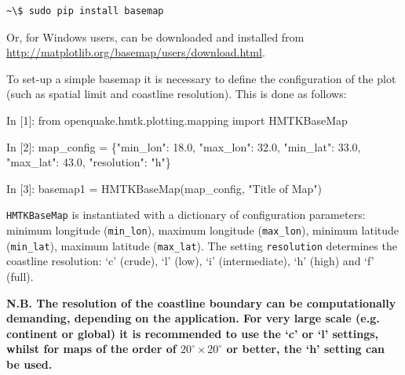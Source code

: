 \begin{Verbatim}[frame=single, commandchars=\\\{\}, fontsize=\scriptsize]
~\$ sudo pip install basemap
\end{Verbatim}   

Or, for Windows users, can be downloaded and installed from\\ \href{http://matplotlib.org/basemap/users/download.html}{http://matplotlib.org/basemap/users/download.html}. 

To set-up a simple basemap it is necessary to define the configuration of the plot (such as spatial limit and coastline resolution). This is done as follows:

\begin{python}[frame=single]
In [1]: from openquake.hmtk.plotting.mapping import HMTKBaseMap

In [2]: map_config = \{"min_lon": 18.0,
                       "max_lon": 32.0,
                       "min_lat": 33.0,
                       "max_lat": 43.0,
                       "resolution": "h"\}

In [3]: basemap1 = HMTKBaseMap(map_config, "Title of Map")
\end{python}

\verb=HMTKBaseMap= is instantiated with a dictionary of configuration parameters: minimum longitude (\verb=min_lon=), maximum longitude (\verb=max_lon=), minimum latitude (\verb=min_lat=), maximum latitude (\verb=max_lat=). The setting \verb=resolution= determines the coastline resolution: `c' (crude), `l' (low), `i' (intermediate), `h' (high) and `f' (full).

\noindent \textbf{N.B. The resolution of the coastline boundary can be computationally demanding, depending on the application. For very large scale (e.g. continent or global) it is recommended to use the `c' or `l' settings, whilst for maps of the order of $20^{\circ} \times 20^{\circ}$ or better, the `h' setting can be used.} 

